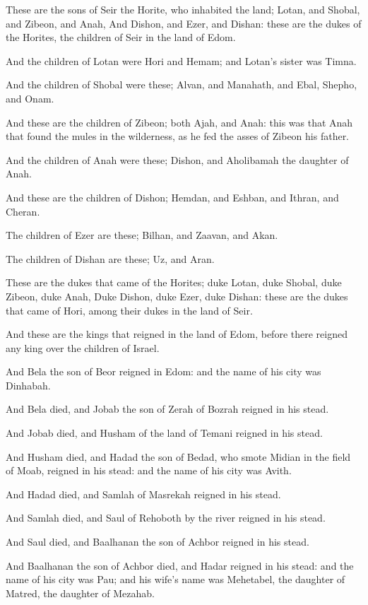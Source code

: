 \verse These are the sons of Seir the Horite, who inhabited the land; Lotan, and Shobal, and Zibeon, and Anah, \verse And Dishon, and Ezer, and Dishan: these are the dukes of the Horites, the children of Seir in the land of Edom.

\verse And the children of Lotan were Hori and Hemam; and Lotan's sister was Timna.

\verse And the children of Shobal were these; Alvan, and Manahath, and Ebal, Shepho, and Onam.

\verse And these are the children of Zibeon; both Ajah, and Anah: this was that Anah that found the mules in the wilderness, as he fed the asses of Zibeon his father.

\verse And the children of Anah were these; Dishon, and Aholibamah the daughter of Anah.

\verse And these are the children of Dishon; Hemdan, and Eshban, and Ithran, and Cheran.

\verse The children of Ezer are these; Bilhan, and Zaavan, and Akan.

\verse The children of Dishan are these; Uz, and Aran.

\verse These are the dukes that came of the Horites; duke Lotan, duke Shobal, duke Zibeon, duke Anah, \verse Duke Dishon, duke Ezer, duke Dishan: these are the dukes that came of Hori, among their dukes in the land of Seir.

\verse And these are the kings that reigned in the land of Edom, before there reigned any king over the children of Israel.

\verse And Bela the son of Beor reigned in Edom: and the name of his city was Dinhabah.

\verse And Bela died, and Jobab the son of Zerah of Bozrah reigned in his stead.

\verse And Jobab died, and Husham of the land of Temani reigned in his stead.

\verse And Husham died, and Hadad the son of Bedad, who smote Midian in the field of Moab, reigned in his stead: and the name of his city was Avith.

\verse And Hadad died, and Samlah of Masrekah reigned in his stead.

\verse And Samlah died, and Saul of Rehoboth by the river reigned in his stead.

\verse And Saul died, and Baalhanan the son of Achbor reigned in his stead.

\verse And Baalhanan the son of Achbor died, and Hadar reigned in his stead: and the name of his city was Pau; and his wife's name was Mehetabel, the daughter of Matred, the daughter of Mezahab.

